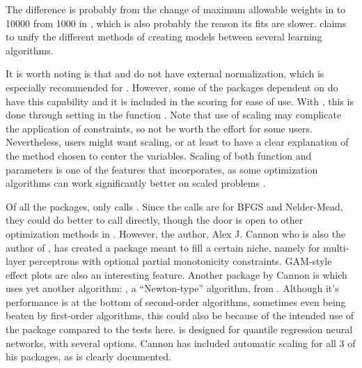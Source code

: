 The difference is probably from the change of maximum allowable weights
in  to 10000 from 1000 in , which is also
probably the reason its fits are slower. 
\citep{R-traineR} claims to unify the different methods of creating
models between several learning algorithms.

It is worth noting is that  and  do not
have external normalization, which is especially recommended for
 . However, some of the packages dependent on
 do have this capability and it is included in the scoring
for ease of use. With , this is done through setting
 in the function . Note that use of
scaling may complicate the application of constraints, so not be worth
the effort for some users. Nevertheless, users might want scaling, or at
least to have a clear explanation of the method chosen to center the
variables. Scaling of both function and parameters is one of the
features that  \citep{R-optimx} incorporates, as some
optimization algorithms can work significantly better on scaled problems
\citep{Nash-nlpor14}.

Of all the packages, only  \citep{R-monmlp} calls
. Since the calls are for BFGS and Nelder-Mead, they
could do better to call  directly, though the door is open
to other optimization methods in . However, the author,
Alex J. Cannon who is also the author of , has created
a package meant to fill a certain niche, namely for multi-layer
perceptrons with optional partial monotonicity constraints. GAM-style
effect plots are also an interesting feature. Another package by Cannon
is  \citep{R-qrnn} which uses yet another algorithm:
, a ``Newton-type'' algorithm, from . Although
it's performance is at the bottom of second-order algorithms, sometimes
even being beaten by first-order algorithms, this could also be because
of the intended use of the package compared to the tests here.
 is designed for quantile regression neural networks, with
several options. Cannon has included automatic scaling for all 3 of his
packages, as is clearly documented.

